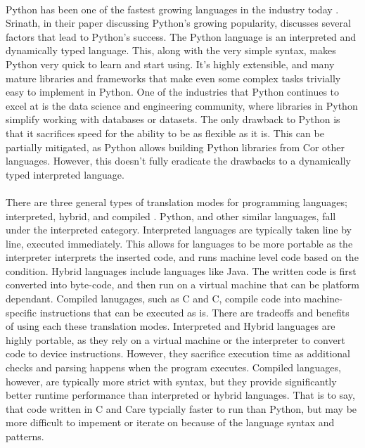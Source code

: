 \documentclass[12pt]{article}
\newcommand{\CC}{C\nolinebreak\hspace{-.05em}\raisebox{.4ex}{\tiny\bf +}\nolinebreak\hspace{-.10em}\raisebox{.4ex}{\tiny\bf + }}
\begin{document}
\paragraph{}
Python has been one of the fastest growing languages in the industry today \cite{article_python_growing_language}.
Srinath, in their paper discussing Python's growing popularity, discusses several factors that lead to Python's success.
The Python language is an interpreted and dynamically typed language.
This, along with the very simple syntax, makes Python very quick to learn and start using.
It's highly extensible, and many mature libraries and frameworks that make even some complex tasks trivially easy to implement in Python.
One of the industries that Python continues to excel at is the data science and engineering community, where libraries in Python simplify working with databases or datasets.
The only drawback to Python is that it sacrifices speed for the ability to be as flexible as it is.
This can be partially mitigated, as Python allows building Python libraries from \CC  or other languages.
However, this doesn't fully eradicate the drawbacks to a dynamically typed interpreted language.

\paragraph{}
There are three general types of translation modes for programming languages; interpreted, hybrid, and compiled \cite{article_compiled_interpreted_hybrid_languages}.
Python, and other similar languages, fall under the interpreted category.
Interpreted languages are typically taken line by line, executed immediately.
This allows for languages to be more portable as the interpreter interprets the inserted code, and runs machine level code based on the condition.
Hybrid languages include languages like Java.
The written code is first converted into byte-code, and then run on a virtual machine that can be platform dependant.
Compiled lanugages, such as C and \CC, compile code into machine-specific instructions that can be executed as is.
There are tradeoffs and benefits of using each these translation modes.
Interpreted and Hybrid languages are highly portable, as they rely on a virtual machine or the interpreter to convert code to device instructions.
However, they sacrifice execution time as additional checks and parsing happens when the program executes.
Compiled languages, however, are typically more strict with syntax, but they provide significantly better runtime performance than interpreted or hybrid languages.
That is to say, that code written in C and \CC are typcially faster to run than Python, but may be more difficult to impement or iterate on because of the language syntax and patterns.
\end{document}
